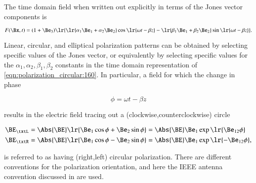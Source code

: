 

The time domain field when written out explicitly in terms of the Jones vector components is

\begin{dmath}\label{eqn:polarization_circular:160}
F(\Bx, t) = (1 + \Be_3) \lr{
\lr{ \alpha_1 \Be_1 + \alpha_2 \Be_2 } \cos\lr{ \omega t - \beta z }
-\lr{ \beta_1 \Be_1 + \beta_2 \Be_2 } \sin\lr{ \omega t - \beta z }
}.
\end{dmath}

Linear, circular, and elliptical polarization patterns can be obtained by selecting specific values of the Jones vector, or equivalently by selecting specific values for the \( \alpha_1, \alpha_2, \beta_1, \beta_2 \) constants in the time domain representation of \cref{eqn:polarization_circular:160}.
In particular,
a field for which the
change in phase

\begin{dmath}\label{eqn:polarization_circular:520}
\phi = \omega t - \beta z
\end{dmath}

results in the electric field tracing out a (clockwise,counterclockwise) circle

\begin{dmath}\label{eqn:polarization_circular:180}
\begin{aligned}
\BE_\txtL &= \Abs{\BE} \lr{ \Be_1 \cos\phi + \Be_2 \sin\phi } = \Abs{\BE} \Be_1 \exp\lr{  \Be_{12} \phi } \\
\BE_\txtR &= \Abs{\BE} \lr{ \Be_1 \cos\phi - \Be_2 \sin\phi } = \Abs{\BE} \Be_1 \exp\lr{ -\Be_{12} \phi },
\end{aligned}
\end{dmath}

is referred to as having
(right,left) circular polarization.
There are different conventions for the polarization orientation, and here the IEEE antenna convention discussed in \citep{balanis1989advanced} are used.


